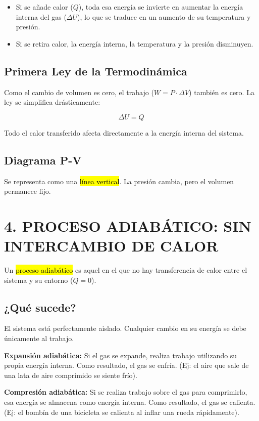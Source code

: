 \documentclass{article}
\begin{document}
\begin{itemize}
    \item Si se añade calor ($Q$), toda esa energía se invierte en aumentar la energía interna del gas ($\Delta U$), lo que se traduce en un aumento de su temperatura y presión.
    \item Si se retira calor, la energía interna, la temperatura y la presión disminuyen.
\end{itemize}

\subsection*{Primera Ley de la Termodinámica}

Como el cambio de volumen es cero, el trabajo ($W = P \cdot \Delta V$) también es cero. La ley se simplifica drásticamente:

$$\Delta U = Q$$

Todo el calor transferido afecta directamente a la energía interna del sistema.

\subsection*{Diagrama P-V}

Se representa como una \hl{línea vertical}. La presión cambia, pero el volumen permanece fijo.

\vspace{5mm}

\section*{4. PROCESO ADIABÁTICO: SIN INTERCAMBIO DE CALOR}

Un \hl{proceso adiabático} es aquel en el que no hay transferencia de calor entre el sistema y su entorno ($Q = 0$).

\subsection*{¿Qué sucede?}

El sistema está perfectamente aislado. Cualquier cambio en su energía se debe únicamente al trabajo.

\textbf{Expansión adiabática:} Si el gas se expande, realiza trabajo utilizando su propia energía interna. Como resultado, el gas se enfría. (Ej: el aire que sale de una lata de aire comprimido se siente frío).

\textbf{Compresión adiabática:} Si se realiza trabajo sobre el gas para comprimirlo, esa energía se almacena como energía interna. Como resultado, el gas se calienta. (Ej: el bombín de una bicicleta se calienta al inflar una rueda rápidamente).
\end{document}
